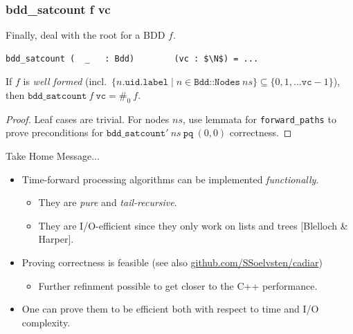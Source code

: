\documentclass[english, aspectratio=169]{beamer}
\newcommand{\ns}[0]{\ensuremath{\mathit{ns}}}
\newcommand{\pq}[0]{\ensuremath{\texttt{pq}}}
\newcommand{\vc}[0]{\ensuremath{\texttt{vc}}}
\begin{document}
\begin{frame} %
  \frametitle{bdd\_satcount f vc}

  Finally, deal with the root for a BDD $f$.

  \begin{lstlisting}
bdd_satcount (  _   : Bdd)        (vc : $\N$) = ...
  \end{lstlisting}

  \begin{theorem}
    If $f$ is \emph{well formed} (incl.\
    $\{ n.\texttt{uid}.\texttt{label} \mid n \in \texttt{Bdd::Nodes}\ \ns \} \subseteq \{ 0, 1,
    \dots \vc-1 \}$),\\then $\texttt{bdd\_satcount}\ f\ \vc = \#_0\ f$.
  \end{theorem}
  \begin{proof}
    Leaf cases are trivial. For nodes \ns, use lemmata for \texttt{forward\_paths} to prove
    preconditions for $\texttt{bdd\_satcount}'\ \ns\ \pq\ (0,0)$ correctness.
  \end{proof}
\end{frame}

\blankframe

\begin{frame}
  \begin{center}
    \LARGE\bf

    Take Home Message...
  \end{center}

  \begin{itemize}
  \item Time-forward processing algorithms can be implemented \emph{functionally}.
    \begin{itemize}
    \item They are \emph{pure} and \emph{tail-recursive}.
    \item They are I/O-efficient since they only work on lists and trees [Blelloch \& Harper].
    \end{itemize}

    \bigskip

  \item Proving correctness is feasible (see also
    \href{https://github.com/SSoelvsten/cadiar}{github.com/SSoelvsten/cadiar})
    \begin{itemize}
    \item Further refinment possible to get closer to the C++ performance.
    \end{itemize}

    \bigskip

  \item One can prove them to be efficient both with respect to time and I/O complexity.
  \end{itemize}
\end{frame}
\end{document}
